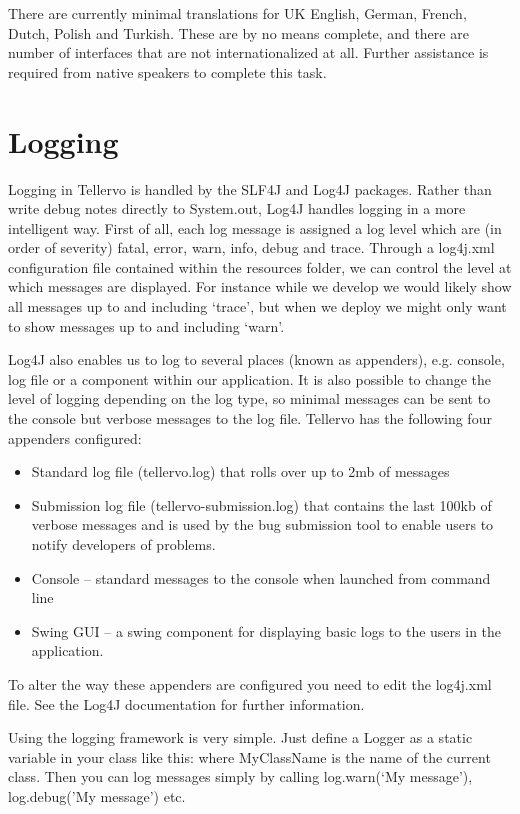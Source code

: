 There are currently minimal translations for UK English, German, French, Dutch, Polish and Turkish.  These are by no means complete, and there are number of interfaces that are not internationalized at all.  Further assistance is required from native speakers to complete this task.

\section{Logging}
Logging in Tellervo is handled by the SLF4J and Log4J packages.  Rather than write debug notes directly to System.out, Log4J handles logging in a more intelligent way.  First of all, each log message is assigned a log level which are (in order of severity) fatal, error, warn, info, debug and trace.  Through a log4j.xml configuration file contained within the resources folder, we can control the level at which messages are displayed.  For instance while we develop we would likely show all messages up to and including `trace', but when we deploy we might only want to show messages up to and including `warn'. 

Log4J also enables us to log to several places (known as appenders), e.g. console, log file or a component within our application.  It is also possible to change the level of logging depending on the log type, so minimal messages can be sent to the console but verbose messages to the log file.  Tellervo has the following four appenders configured:

\begin{itemize}
 \item Standard log file (tellervo.log) that rolls over up to 2mb of messages
 \item Submission log file (tellervo-submission.log) that contains the last 100kb of verbose messages and is used by the bug submission tool to enable users to notify developers of problems.
 \item Console -- standard messages to the console when launched from command line
 \item Swing GUI -- a swing component for displaying basic logs to the users in the application.
\end{itemize}

To alter the way these appenders are configured you need to edit the log4j.xml file.  See the Log4J documentation for further information.

Using the logging framework is very simple.  Just define a Logger as a static variable in your class like this:
where MyClassName is the name of the current class.  Then you can log messages simply by calling log.warn(`My message'), log.debug('My message') etc.


